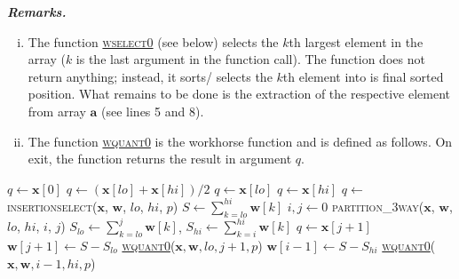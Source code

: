 \documentclass[a4paper,oneside,11pt,DIV=12]{scrartcl}
\begin{document}
\vspace{1em}
\noindent\textbf{\sffamily \small \itshape Remarks.}
\vspace{-0.5em}
\begin{enumerate}[i)]
	\item The function \hyperlink{alg:wselect0}{\textsc{wselect0}} (see below)
		selects the $k$th largest element in the array ($k$ is the last
		argument in the function call). The function does not return
		anything; instead, it sorts/ selects the $k$th element into is
		final sorted position. What remains to be done is the extraction
		of the respective element from array $\bm a$ (see lines 5 and 8).
	\item The function \hyperlink{alg:wquant0}{\textsc{wquant0}} is the
		workhorse function and is defined as follows. On exit, the function
		returns the result in argument $q$.
\end{enumerate}

\vspace{1em}

\begin{algorithmic}[1]
	\hypertarget{alg:wquant0}{}
			\State $q \gets \bm x[0]$
			\State \Return
		\EndIf
				\State $q \gets (\bm x[lo] + \bm x[hi]) / 2$
				\State \Return
				\State $q \gets \bm x[lo]$
				\State \Return
			\Else
				\State $q \gets \bm x[hi]$
				\State \Return
			\EndIf
		\EndIf
 			\State $q \gets$ \textsc{insertionselect}($\bm x$, $\bm w$,
				$lo$, $hi$, $p$)
		\EndIf
		\State $S \gets \sum_{k=lo}^{hi} \bm w[k]$
		\State $i,j \gets 0$
		\State \textsc{partition\_3way($\bm x$, $\bm w$, $lo$, $hi$, $i$, $j$)}
		\State $S_{lo} \gets \sum_{k=lo}^j \bm w[k]$, \quad $S_{hi} \gets
			\sum_{k=i}^{hi} \bm w[k]$
			\State $q \gets \bm x[j + 1]$
			\State \Return
		\Else
				\State $\bm w[j+1] \gets S - S_{lo}$
				\State \hyperlink{alg:wquant0}{\textsc{wquant0}}($\bm x,
					\bm w, lo, j + 1, p$)
			\Else
				\State $\bm w[i-1] \gets S - S_{hi}$
				\State \hyperlink{alg:wquant0}{\textsc{wquant0}}($\bm x,
					\bm w, i-1, hi, p$)
			\EndIf
		\EndIf
	\EndFunction
\end{algorithmic}
\end{document}
